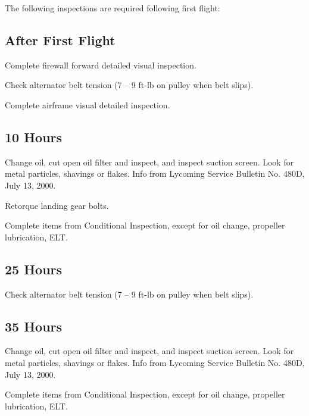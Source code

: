 The following inspections are required following first flight:

\subsection{After First Flight} 
\begin{enumerate*}
	\item Complete firewall forward detailed visual inspection. 
	\item Check alternator belt tension (7 -- 9 ft-lb on pulley when belt slips). 
	\item Complete airframe visual detailed inspection. 
\end{enumerate*}


\subsection{10 Hours} 
\begin{enumerate*}
	\item Change oil, cut open oil filter and inspect, and inspect suction screen. Look for metal particles, shavings or flakes. Info from Lycoming Service Bulletin No. 480D, July 13, 2000. 
	\item Retorque landing gear bolts.
	\item Complete items from Conditional Inspection, except for oil change, propeller lubrication, ELT. 
\end{enumerate*}

\subsection{25 Hours} 
\begin{enumerate*}
	\item Check alternator belt tension (7 -- 9 ft-lb on pulley when belt slips). 
\end{enumerate*}

\subsection{35 Hours} 
\begin{enumerate*}
	\item Change oil, cut open oil filter and inspect, and inspect suction screen. Look for metal particles, shavings or flakes. Info from Lycoming Service Bulletin No. 480D, July 13, 2000. 
	\item Complete items from Conditional Inspection, except for oil change, propeller lubrication, ELT. 
\end{enumerate*}

